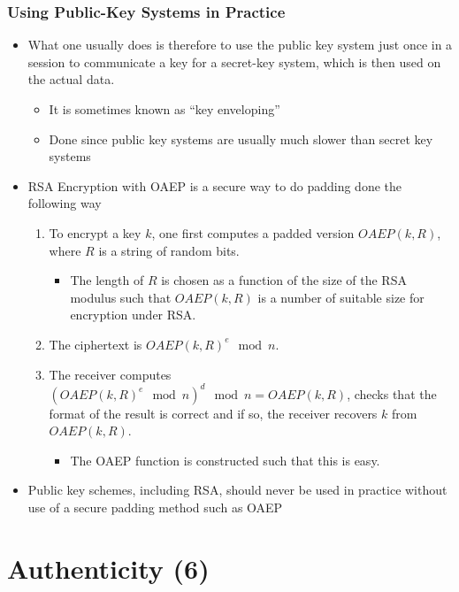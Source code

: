\documentclass[11pt]{article}
\begin{document}
\subsubsection{Using Public-Key Systems in Practice}
\label{sec:orga1e2c01}
\begin{itemize}
\item What one usually does is therefore to use the public key system just once in a session to communicate a key for a secret-key system, which is then used on the actual data.
\begin{itemize}
\item It is sometimes known as “key enveloping”
\item Done since public key systems are usually much slower than secret key systems
\end{itemize}

\item RSA Encryption with OAEP is a secure way to do padding done the following way
\begin{enumerate}
\item To encrypt a key \(k\), one first computes a padded version \(OAEP (k, R)\), where \(R\) is a string of random bits.
\begin{itemize}
\item The length of \(R\) is chosen as a function of the size of the RSA modulus such that \(OAEP (k, R)\) is a number of suitable size for encryption under RSA.
\end{itemize}
\item The ciphertext is \(OAEP (k, R)^e \mod n\).
\item The receiver computes \((OAEP (k, R)^e \mod n)^d \mod n = OAEP (k, R)\), checks that the format of the result is correct and if so, the receiver recovers \(k\) from \(OAEP (k, R)\).
\begin{itemize}
\item The OAEP function is constructed such that this is easy.
\end{itemize}
\end{enumerate}

\item Public key schemes, including RSA, should never be used in practice without use of a secure padding method such as OAEP
\end{itemize}

\section{Authenticity (6)}
\label{sec:org3f72397}
\end{document}
